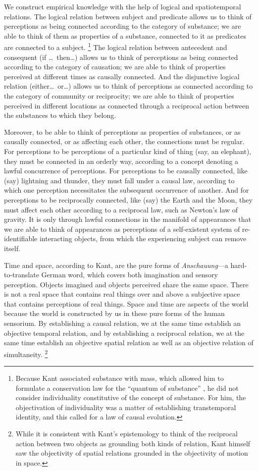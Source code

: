 \documentclass[12pt]{article}
\begin{document}
We construct empirical knowledge with the help of logical and spatiotemporal relations. The logical relation between subject and predicate allows us to think of perceptions as being connected according to the {category of substance}; we are able to think of them as properties of a substance, connected to it as predicates are connected to a subject.%
\footnote{Because Kant associated substance with mass, which allowed him to formulate a conservation law for the ``quantum of substance'' \cite{KantCPR3}, he did not consider individuality constitutive of the concept of substance. For him, the objectivation of individuality was a matter of establishing transtemporal identity, and this called for a law of causal evolution.}
The logical relation between antecedent and consequent (if \dots\ then\dots) allows us to think of perceptions as being connected according to the {category of causation}; we are able to think of properties perceived at different times as causally connected. And the disjunctive logical relation (either\dots\ or\dots) allows us to think of perceptions as connected according to the category of community or reciprocity; we are able to think of properties perceived in different locations as connected through a reciprocal action between the substances to which they belong.

Moreover, to be able to think of perceptions as properties of substances, or as causally connected, or as affecting each other, the connections must be regular. For perceptions to be perceptions of a particular kind of thing (say, an elephant), they must be connected in an orderly way, according to a concept denoting a lawful concurrence of perceptions. For perceptions to be causally connected, like (say) lightning and thunder, they must fall under a causal law, according to which one perception necessitates the subsequent occurrence of another. And for perceptions to be reciprocally connected, like (say) the Earth and the Moon, they must affect each other according to a reciprocal law, such as Newton's law of gravity. It is only through lawful connections in the {manifold of appearances} that we are able to think of appearances as perceptions of a self-existent system of re-identifiable interacting objects, from which the experiencing subject can remove itself.

Time and space, according to Kant, are the pure forms of \emph{Anschauung}---a hard-to-translate German word, which covers both imagination and sensory perception. Objects imagined and objects perceived share the same space. There is not a real space that contains real things over and above a subjective space that contains perceptions of real things. Space and time are aspects of the world because the world is constructed by us in these pure forms of the human sensorium. By establishing a causal relation, we at the same time establish an objective temporal relation, and by establishing a reciprocal relation, we at the same time establish an objective spatial relation as well as an objective relation of simultaneity.%
\footnote{While it is consistent with Kant's epistemology to think of the reciprocal action between two objects as grounding both kinds of relation, Kant himself saw the objectivity of spatial relations grounded in the objectivity of motion in space.}
\end{document}
